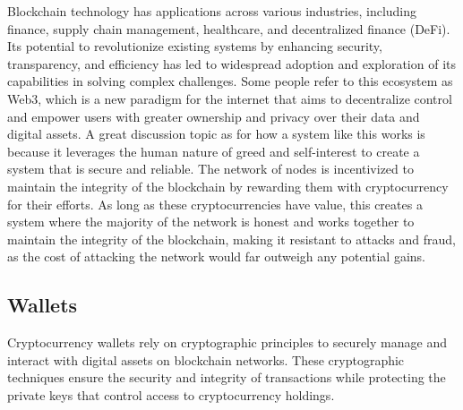 Blockchain technology has applications across various industries, including finance, supply chain management, healthcare, and decentralized finance (DeFi). Its potential to revolutionize existing systems by enhancing security, transparency, and efficiency has led to widespread adoption and exploration of its capabilities in solving complex challenges. Some people refer to this ecosystem as Web3, which is a new paradigm for the internet that aims to decentralize control and empower users with greater ownership and privacy over their data and digital assets.
A great discussion topic as for how a system like this works is because it leverages the human nature of greed and self-interest to create a system that is secure and reliable. The network of nodes is incentivized to maintain the integrity of the blockchain by rewarding them with cryptocurrency for their efforts. As long as these cryptocurrencies have value, this creates a system where the majority of the network is honest and works together to maintain the integrity of the blockchain, making it resistant to attacks and fraud, as the cost of attacking the network would far outweigh any potential gains.

\subsection{Wallets}
\label{subsec:wallets}

Cryptocurrency wallets rely on cryptographic principles to securely manage and interact with digital assets on blockchain networks. These cryptographic techniques ensure the security and integrity of transactions while protecting the private keys that control access to cryptocurrency holdings.

~

